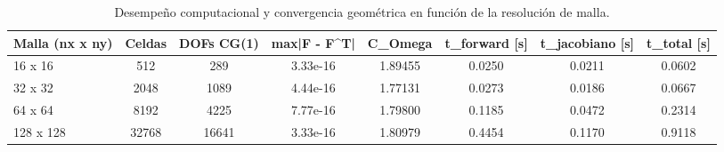 \begin{table}[htbp]
\centering
\caption{Desempeño computacional y convergencia geométrica en función de la resolución de malla.}
\label{tab:desempeno_malla}
\begin{tabular}{lccccccc}
\hline
Malla (nx x ny) & Celdas & DOFs CG(1) & max|F - F^T| & C_Omega & t_forward [s] & t_jacobiano [s] & t_total [s] \\
\hline
16 x 16 & 512 & 289 & 3.33e-16 & 1.89455 & 0.0250 & 0.0211 & 0.0602 \\
32 x 32 & 2048 & 1089 & 4.44e-16 & 1.77131 & 0.0273 & 0.0186 & 0.0667 \\
64 x 64 & 8192 & 4225 & 7.77e-16 & 1.79800 & 0.1185 & 0.0472 & 0.2314 \\
128 x 128 & 32768 & 16641 & 3.33e-16 & 1.80979 & 0.4454 & 0.1170 & 0.9118 \\
\hline
\end{tabular}
\end{table}
